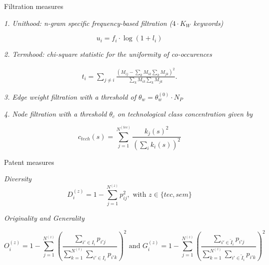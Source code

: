 \documentclass{beamer}
\begin{document}
\begin{frame}{Filtration measures}

\label{slide:filtration}
\hyperlink{slide:relevance}{}



    
    \textit{1. Unithood: n-gram specific frequency-based filtration ($4\cdot K_W$ keywords)}
    
	\[
	u_i = f_i\cdot \log{(1 + l_i)}
	\]
    
    \medskip
    
    \textit{2. Termhood: chi-square statistic for the uniformity of co-occurences}
    
    \medskip
    
    \begin{eqnarray}
\label{termhood}
t_i = \sum_{j\neq i}\frac{\left( M_{ij} - \sum_{k}M_{ik} \sum_{k} M_{jk}\right)^2}{\sum_{k}M_{ik} \sum_{k} M_{jk}}.
\end{eqnarray}

    \medskip

	\textit{3. Edge weight filtration with a threshold of $\theta_w = \theta_w^{(0)}\cdot N_P$}
	
	\medskip

	\textit{4. Node filtration with a threshold $\theta_c$ on technological class concentration given by}
    
    \[
    c_{tech}(s) = \displaystyle \sum_{j=1}^{N^{(tec)}} \frac{k_j(s)^2}{ \left(\sum_i k_i(s)\right)^2}
    \]
    
    
\end{frame}

\begin{frame}{Patent measures}
\label{slide:measures}
\hyperlink{slide:diversity}{}
    
    \textit{Diversity}
    \[
D_i^{(z)} = 1 - \sum_{j =1}^{N^{(z)}} {p_{ij}^2}, \text{ with } z \in \{tec, sem\}
	\]
    
    \medskip

	\textit{Originality and Generality}

	\[
O_i^{(z)} = \displaystyle 1 - \sum_{j =1}^{N^{(z)}}{\left(\frac{\displaystyle \sum_{i' \in I_i}{p_{i'j}}}{\displaystyle \sum_{k =1}^{N^{(z)}}{\displaystyle \sum_{i' \in I_i}{p_{i'k}}}}\right)^2}
\text{ and } G_i^{(z)} = \displaystyle 1 - \sum_{j =1}^{N^{(z)}}{\left(\frac{\displaystyle \sum_{i' \in \tilde{I}_i}{p_{i'j}}}{\displaystyle \sum_{k =1}^{N^{(z)}}{\displaystyle \sum_{i' \in \tilde{I}_i}{p_{i'k}}}}\right)^2}
\]
    

    
\end{frame}
\end{document}
